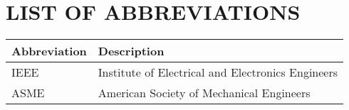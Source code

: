 \part{LIST OF ABBREVIATIONS}
\doublespacing

\begin{center}
	\begin{tabular}{l l}
		\hline
		Abbreviation	&	Description \\
		\hline 
		IEEE			&	Institute of Electrical and Electronics Engineers \\
		ASME			&	American Society of Mechanical Engineers \\
		\hline
	\end{tabular}
\end{center}